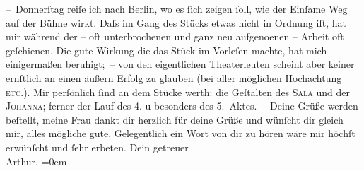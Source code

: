 \begin{ledgroupsized}[t]{13cm}
           \pstart
           – Donnerſtag reiſe ich nach Berlin,
               wo es ſich zeigen ſoll, wie der Einſame Weg auf
               der Bühne wirkt. Daſs im Gang des Stücks etwas nicht in Ordnung iſt, hat mir während
               der – oft unterbrochenen und ganz neu aufgeno{\geminationm}enen –
               Arbeit oft geſchienen. Die gute Wirkung {\pb}die das Stück im
               Vorleſen machte, hat mich einigermaßen beruhigt; – von den eigentlichen Theaterleuten
               scheint aber keiner ernſtlich an einen äußern Erfolg zu glauben (bei aller möglichen
               Hochachtung \textsc{etc.}). Mir perſönlich ſind an dem Stücke werth:
               die Geſtalten des \textsc{Sala} und der \textsc{Johanna}; ferner der Lauf des 4. u besonders des 5. Aktes. –\pend
           \pstart
           Deine Grüße werden beſtellt, meine Frau dankt dir herzlich {\pb}für deine Grüße und
               wünſcht dir gleich mir, alles mögliche gute.\pend
           \pstart
           Gelegentlich ein Wort von dir zu hören wäre mir höchſt erwünſcht und ſehr
               erbeten.\pend
           \pstart
           Dein getreuer{\\[\baselineskip]}\spacefill\mbox{Arthur.}\pend
           \leftskip=0em{}
         
         \endnumbering{}\end{ledgroupsized}  \newcommand{\dateiname}{L01368}\newcommand{\titel}{Arthur Schnitzler an Hermann Bahr, 1. 2. 1904}\newcommand{\editorInnen}{ Kurt Ifkovits,  Martin Anton Müller}
      